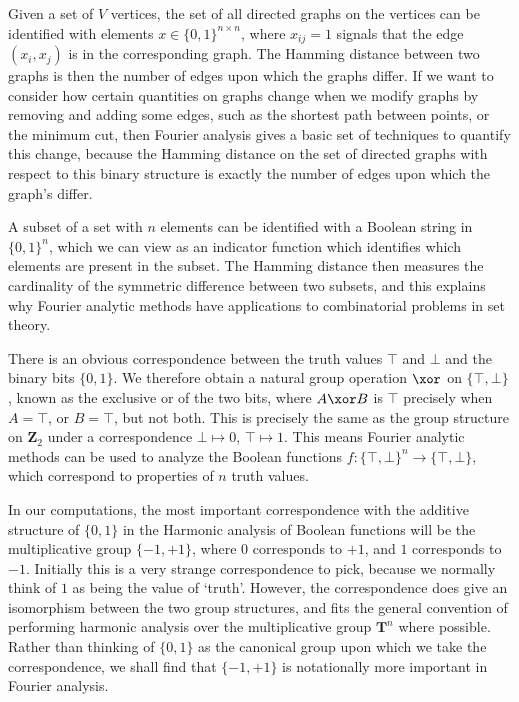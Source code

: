 \begin{example}
    Given a set of $V$ vertices, the set of all directed graphs on the vertices can be identified with elements $x \in \{ 0, 1 \}^{n \times n}$, where $x_{ij} = 1$ signals that the edge $(x_i, x_j)$ is in the corresponding graph. The Hamming distance between two graphs is then the number of edges upon which the graphs differ. If we want to consider how certain quantities on graphs change when we modify graphs by removing and adding some edges, such as the shortest path between points, or the minimum cut, then Fourier analysis gives a basic set of techniques to quantify this change, because the Hamming distance on the set of directed graphs with respect to this binary structure is exactly the number of edges upon which the graph's differ.
\end{example}

\begin{example}
    A subset of a set with $n$ elements can be identified with a Boolean string in $\{ 0, 1 \}^n$, which we can view as an indicator function which identifies which elements are present in the subset. The Hamming distance then measures the cardinality of the symmetric difference between two subsets, and this explains why Fourier analytic methods have applications to combinatorial problems in set theory.
\end{example}

\begin{example}
    There is an obvious correspondence between the truth values $\top$ and $\bot$ and the binary bits $\{ 0, 1 \}$. We therefore obtain a natural group operation $\xor$ on $\{ \top, \bot \}$, known as the exclusive or of the two bits, where $A \xor B$ is $\top$ precisely when $A = \top$, or $B = \top$, but not both. This is precisely the same as the group structure on $\mathbf{Z}_2$ under a correspondence $\bot \mapsto 0$, $\top \mapsto 1$. This means Fourier analytic methods can be used to analyze the Boolean functions $f: \{ \top, \bot \}^n \to \{ \top, \bot \}$, which correspond to properties of $n$ truth values.
\end{example}

In our computations, the most important correspondence with the additive structure of $\{ 0, 1 \}$ in the Harmonic analysis of Boolean functions will be the multiplicative group $\{ -1, +1 \}$, where 0 corresponds to $+1$, and $1$ corresponds to $-1$. Initially this is a very strange correspondence to pick, because we normally think of $1$ as being the value of `truth'. However, the correspondence does give an isomorphism between the two group structures, and fits the general convention of performing harmonic analysis over the multiplicative group $\mathbf{T}^n$ where possible. Rather than thinking of $\{ 0, 1 \}$ as the canonical group upon which we take the correspondence, we shall find that $\{ -1, +1 \}$ is notationally more important in Fourier analysis.

